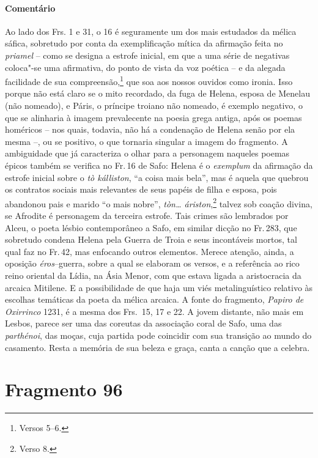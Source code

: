 \paragraph{Comentário} Ao lado dos Frs. 1 e 31, o 16 é seguramente um dos mais estudados da mélica \EP[2]
sáfica, sobretudo por conta da exemplificação mítica da afirmação feita no
\textit{priamel} -- como
se designa a estrofe inicial, em que a uma série de
negativas coloca"-se uma afirmativa, do ponto de vista da voz poética -- e da
alegada facilidade de sua compreensão,\footnote{Versos 5--6.} que soa aos nossos ouvidos
como ironia. Isso porque não está claro se o mito recordado, da fuga de Helena, esposa 
de Menelau (não nomeado), e Páris, o príncipe troiano não nomeado, é exemplo
negativo, o que se alinharia à imagem prevalecente na poesia grega antiga, após
os poemas homéricos -- nos quais, todavia, não há a condenação de Helena senão por ela mesma --, ou se positivo, o que tornaria singular a imagem do fragmento. A
ambiguidade que já caracteriza o olhar para a personagem naqueles poemas épicos também se verifica no Fr.\,16 de Safo: Helena é o \textit{exemplum} da afirmação da estrofe inicial sobre o \textit{tò kálliston}, ``a coisa mais bela'', mas é aquela que quebrou os contratos sociais mais relevantes de seus papéis de filha e esposa, pois abandonou pais e marido ``o mais nobre'', \textit{tòn\ldots{} áriston},\footnote{Verso 8.} talvez sob coação divina, se Afrodite é personagem da terceira estrofe. Tais crimes são lembrados por Alceu, o poeta lésbio contemporâneo a Safo, em similar dicção no Fr.\,283, que sobretudo condena Helena pela Guerra de Troia e seus incontáveis mortos, tal qual faz no Fr.\,42, mas enfocando outros elementos. Merece atenção, ainda, a
oposição \textit{éros}--guerra, sobre a qual se elaboram os versos, e a
referência ao rico reino oriental da Lídia, na Ásia Menor, com que estava
ligada a aristocracia da arcaica Mitilene. E a possibilidade de que haja um
viés metalinguístico relativo às escolhas temáticas da poeta da mélica arcaica.
A fonte do fragmento, \textit{Papiro de Oxirrinco} 1231, é a mesma dos Frs.~15, 17 e 22.
A jovem distante, não mais em Lesbos, parece ser uma das coreutas da associação coral de Safo, uma das \textit{parthénoi}, das moças, cuja partida pode coincidir com sua transição ao mundo do casamento. Resta a memória de sua beleza e graça, canta a canção que a celebra.




\pagebreak
\section{Fragmento 96}

